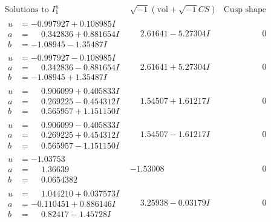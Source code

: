 \documentclass[1p]{elsarticle_modified}
\theoremstyle{definition}
\newcommand{\I}{\sqrt{-1}}
\begin{document}
$$\begin{array}{c|c|c}  
\text{Solutions to }I^u_{1}& \I (\text{vol} + \sqrt{-1}CS) & \text{Cusp shape}\\
 \hline 
\begin{aligned}
u &= -0.997927 + 0.108985 I \\
a &= \phantom{-}0.342836 + 0.881654 I \\
b &= -1.08945 - 1.35487 I\end{aligned}
 & \phantom{-}2.61641 - 5.27304 I & \phantom{-0.000000 } 0 \\ \hline\begin{aligned}
u &= -0.997927 - 0.108985 I \\
a &= \phantom{-}0.342836 - 0.881654 I \\
b &= -1.08945 + 1.35487 I\end{aligned}
 & \phantom{-}2.61641 + 5.27304 I & \phantom{-0.000000 } 0 \\ \hline\begin{aligned}
u &= \phantom{-}0.906099 + 0.405833 I \\
a &= \phantom{-}0.269225 - 0.454312 I \\
b &= \phantom{-}0.565957 + 1.151150 I\end{aligned}
 & \phantom{-}1.54507 + 1.61217 I & \phantom{-0.000000 } 0 \\ \hline\begin{aligned}
u &= \phantom{-}0.906099 - 0.405833 I \\
a &= \phantom{-}0.269225 + 0.454312 I \\
b &= \phantom{-}0.565957 - 1.151150 I\end{aligned}
 & \phantom{-}1.54507 - 1.61217 I & \phantom{-0.000000 } 0 \\ \hline\begin{aligned}
u &= -1.03753\phantom{ +0.000000I} \\
a &= \phantom{-}1.36639\phantom{ +0.000000I} \\
b &= \phantom{-}0.0654382\phantom{ +0.000000I}\end{aligned}
 & -1.53008\phantom{ +0.000000I} & \phantom{-0.000000 } 0 \\ \hline\begin{aligned}
u &= \phantom{-}1.044210 + 0.037573 I \\
a &= -0.110451 + 0.886146 I \\
b &= \phantom{-}0.82417 - 1.45728 I\end{aligned}
 & \phantom{-}3.25938 - 0.03179 I & \phantom{-0.000000 } 0 \\ \hline\begin{aligned}

\end{aligned}
\end{array}$$
\end{document}
